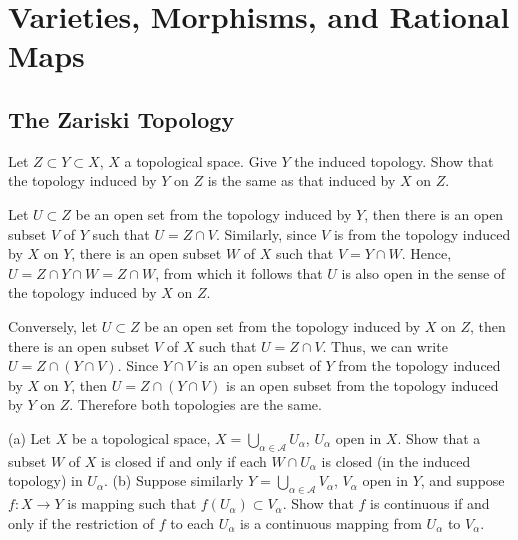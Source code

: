 \chapter{Varieties, Morphisms, and Rational Maps}

\section{The Zariski Topology}

\begin{exercise}
    Let $Z \subset Y \subset X$, $X$ a topological space. Give $Y$ the induced topology. Show that the topology induced by $Y$ on $Z$ is the same as that induced by $X$ on $Z$. \\
\end{exercise}

\begin{solution}
    Let $U \subset Z$ be an open set from the topology induced by $Y$, then there is an open subset $V$ of $Y$ such that $U = Z \cap V$. Similarly, since $V$ is from the topology induced by $X$ on $Y$, there is an open subset $W$ of $X$ such that $V = Y \cap W$. Hence, $U = Z \cap Y \cap W = Z \cap W$, from which it follows that $U$ is also open in the sense of the topology induced by $X$ on $Z$. 
    
    Conversely, let $U \subset Z$ be an open set from the topology induced by $X$ on $Z$, then there is an open subset $V$ of $X$ such that $U = Z \cap V$. Thus, we can write $U = Z \cap (Y \cap V)$. Since $Y \cap V$ is an open subset of $Y$ from the topology induced by $X$ on $Y$, then $U = Z \cap (Y \cap V)$ is an open subset from the topology induced by $Y$ on $Z$. Therefore both topologies are the same. \\
\end{solution}

\begin{exercise}
    (a) Let $X$ be a topological space, $X = \bigcup_{\alpha \in \mathcal{A}} U_{\alpha}$, $U_{\alpha}$ open in $X$. Show that a subset $W$ of $X$ is closed if and only if each $W \cap U_{\alpha}$ is closed (in the induced topology) in $U_{\alpha}$. (b) Suppose similarly $Y = \bigcup_{\alpha\in \mathcal{A}}V_{\alpha}$, $V_{\alpha}$ open in $Y$, and suppose $f : X \to Y$ is mapping such that $f(U_{\alpha}) \subset V_{\alpha}$. Show that $f$ is continuous if and only if the restriction of $f$ to each $U_{\alpha}$ is a continuous mapping from $U_{\alpha}$ to $V_{\alpha}$. \\
\end{exercise}

